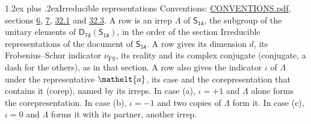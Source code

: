 \documentclass[10pt,a4paper]{article}
\makeatletter
\renewcommand\section{\@startsection{section}{1}{\z@}{-3ex plus -1ex minus -.2ex}%
  {1.2ex plus .2ex}{\normalfont\large\sffamily\bfseries\color{parttitle}}}
\numberwithin{equation}{section}
\newcommand{\eltfont}[1]{{\let\sigma\eltsigma\mathelt{#1}}}
\newcommand{\grp}[1]{\mathsf{#1}}
\newcommand{\elt}[1]{\eltfont{#1}}
\newcommand{\fsind}{\nu_{\mathrm{FS}}}
\makeatother
\begin{document}
\section{Irreducible representations}\label{s:irreps}
Conventions: \href{../../CONVENTIONS.pdf}{CONVENTIONS.pdf}, sections \href{../../../rotation/CONVENTIONS.pdf\#conv.6}{6}, \href{../../../rotation/CONVENTIONS.pdf\#conv.7}{7}, \href{../../CONVENTIONS.pdf\#conv.32.1}{32.1} and \href{../../CONVENTIONS.pdf\#conv.32.3}{32.3}.
\leavevmode\label{n:irrep.Delta}A row is an irrep $\Lambda$ of $\grp{S_{14}}$, the subgroup of the unitary elements of $\grp{D_{7d}}(\grp{S_{14}})$, in the order of the section Irreducible representations of the document of \href{../../../rotation/data/pdf/S14.pdf}{$\grp{S_{14}}$}. \label{n:index.dimension}\label{n:index.frobenius}\label{n:head.irrep}\label{n:head.reality}\label{n:head.conjugate}A row gives its dimension $d$, its Frobenius--Schur indicator $\fsind$, its reality and its complex conjugate (conjugate, a dash for the others), as in that section. \label{n:head.case.corep}\label{n:head.corep}A row also gives the indicator $\iota$ of $\Lambda$ under the representative $\elt{a}$, its case and the corepresentation that contains it (corep), named by its irreps. In case (a), $\iota = +1$ and $\Lambda$ alone forms the corepresentation. In case (b), $\iota = -1$ and two copies of $\Lambda$ form it. In case (c), $\iota = 0$ and $\Lambda$ forms it with its partner, another irrep.
\setlength{\emergencystretch}{2em}\par\setlength{\emergencystretch}{0pt}
\end{document}
